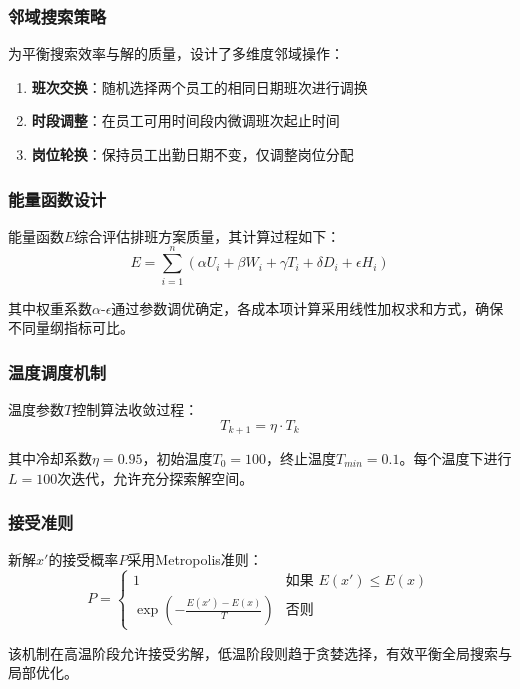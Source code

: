 \documentclass{ctexart}
\begin{document}
\subsubsection{邻域搜索策略}
为平衡搜索效率与解的质量，设计了多维度邻域操作：
\begin{enumerate}
    \item \textbf{班次交换}：随机选择两个员工的相同日期班次进行调换
    \item \textbf{时段调整}：在员工可用时间段内微调班次起止时间
    \item \textbf{岗位轮换}：保持员工出勤日期不变，仅调整岗位分配
\end{enumerate}

\subsubsection{能量函数设计}
能量函数$E$综合评估排班方案质量，其计算过程如下：
\begin{equation}
E = \sum_{i=1}^{n} \left( \alpha U_i + \beta W_i + \gamma T_i + \delta D_i + \epsilon H_i \right)
\end{equation}

其中权重系数$\alpha$-$\epsilon$通过参数调优确定，各成本项计算采用线性加权求和方式，确保不同量纲指标可比。

\subsubsection{温度调度机制}
温度参数$T$控制算法收敛过程：
\begin{equation}
T_{k+1} = \eta \cdot T_k
\end{equation}

其中冷却系数$\eta=0.95$，初始温度$T_0=100$，终止温度$T_{min}=0.1$。每个温度下进行$L=100$次迭代，允许充分探索解空间。

\subsubsection{接受准则}
新解$x'$的接受概率$P$采用Metropolis准则：
\begin{equation}
P = \begin{cases}
1 & \text{如果 } E(x') \leq E(x) \\
\exp\left(-\frac{E(x')-E(x)}{T}\right) & \text{否则}
\end{cases}
\end{equation}

该机制在高温阶段允许接受劣解，低温阶段则趋于贪婪选择，有效平衡全局搜索与局部优化。
\end{document}
